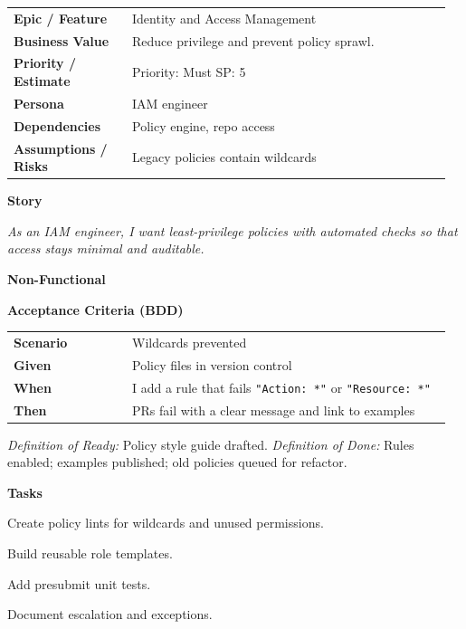 \documentclass[11pt,letterpaper]{article}
\makeatletter
\newenvironment{kvtable}{%
  \par\noindent\begin{tabular}{@{}>{\raggedright\bfseries\arraybackslash}p{0.26\linewidth} >{\raggedright\arraybackslash}p{0.70\linewidth}@{}}
}{\end{tabular}\par}
\newenvironment{bdd}{%
  \par\noindent\begin{tabular}{@{}>{\raggedright\bfseries\arraybackslash}p{0.26\linewidth} >{\raggedright\arraybackslash}p{0.70\linewidth}@{}}
}{\end{tabular}\par}
\newcommand{\DoRDoD}[2]{%
  \vspace{0.35em}
  {\footnotesize\color{Muted}%
    \textit{Definition of Ready:} #1 \; \textbullet\;
    \textit{Definition of Done:} #2%
  }%
}
\newenvironment{storycard}[2]{%
  \begin{tcolorbox}[cloudcard, title={#1 --- #2}]%
}{\end{tcolorbox}}
\newcommand{\sectionlabel}[1]{\par\vspace{0.35em}\textbf{#1}\par}
\makeatother
\begin{document}
\begin{storycard}{CCS-10}{Ch. 10 — Access Policy Specification \& Enforcement}
\begin{kvtable}
Epic / Feature & Identity and Access Management\\
Business Value & Reduce privilege and prevent policy sprawl.\\
Priority / Estimate & Priority: Must \quad SP: 5\\
Persona & IAM engineer\\
Dependencies & Policy engine, repo access\\
Assumptions / Risks & Legacy policies contain wildcards\\
\end{kvtable}
\sectionlabel{Story}
\textit{As an IAM engineer, I want least-privilege policies with automated checks so that access stays minimal and auditable.}
\sectionlabel{Non-Functional}\;
\sectionlabel{Acceptance Criteria (BDD)}
\begin{bdd}
Scenario & Wildcards prevented\\
Given & Policy files in version control\\
When & I add a rule that fails \texttt{"Action: *"} or \texttt{"Resource: *"}\\
Then & PRs fail with a clear message and link to examples\\
\end{bdd}
\DoRDoD{Policy style guide drafted.}{Rules enabled; examples published; old policies queued for refactor.}
\sectionlabel{Tasks}
\begin{checklist}
\item Create policy lints for wildcards and unused permissions.
\item Build reusable role templates.
\item Add presubmit unit tests.
\item Document escalation and exceptions.
\end{checklist}
\end{storycard}
\end{document}
